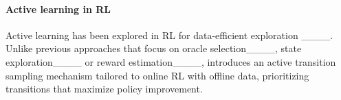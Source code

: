 \paragraph{Active learning in RL}
\vspace{-0.3cm}
Active learning has been explored in RL for data-efficient exploration %
____. %
Unlike previous approaches that focus on %
oracle selection____, state exploration____ or reward estimation____,
\algname introduces an active transition sampling mechanism tailored to online RL with offline data, prioritizing transitions that maximize policy improvement.